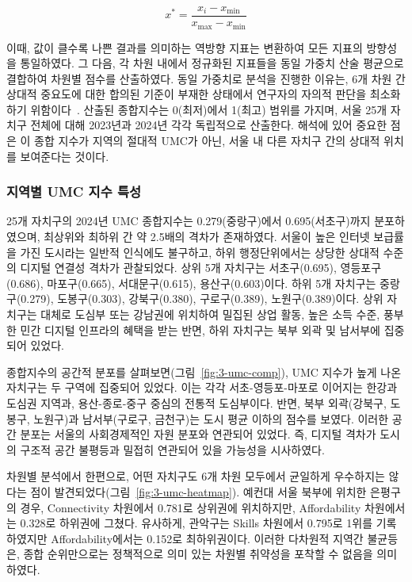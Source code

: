 \begin{equation}\label{eq:minmax}
  x^{*} = \frac{x_{i} - x_{\min}}{x_{\max} - x_{\min}}
\end{equation}

이때, 값이 클수록 나쁜 결과를 의미하는 역방향 지표는 변환하여 모든 지표의 방향성을 통일하였다. 그 다음, 각 차원 내에서 정규화된 지표들을 동일 가중치 산술 평균으로 결합하여 차원별 점수를 산출하였다. 동일 가중치로 분석을 진행한 이유는, 6개 차원 간 상대적 중요도에 대한 합의된 기준이 부재한 상태에서 연구자의 자의적 판단을 최소화하기 위함이다~\citep{ITU2024}. 산출된 종합지수는 0(최저)에서 1(최고) 범위를 가지며, 서울 25개 자치구 전체에 대해 2023년과 2024년 각각 독립적으로 산출한다. 해석에 있어 중요한 점은 이 종합 지수가 지역의 절대적 UMC가 아닌, 서울 내 다른 자치구 간의 상대적 위치를 보여준다는 것이다.

\subsubsection{지역별 UMC 지수 특성}
\label{subsubsec:3-1-3}

25개 자치구의 2024년 UMC 종합지수는 0.279(중랑구)에서 0.695(서초구)까지 분포하였으며, 최상위와 최하위 간 약 2.5배의 격차가 존재하였다. 서울이 높은 인터넷 보급률을 가진 도시라는 일반적 인식에도 불구하고, 하위 행정단위에서는 상당한 상대적 수준의 디지털 연결성 격차가 관찰되었다. 상위 5개 자치구는 서초구(0.695), 영등포구(0.686), 마포구(0.665), 서대문구(0.615), 용산구(0.603)이다. 하위 5개 자치구는 중랑구(0.279), 도봉구(0.303), 강북구(0.380), 구로구(0.389), 노원구(0.389)이다. 상위 자치구는 대체로 도심부 또는 강남권에 위치하여 밀집된 상업 활동, 높은 소득 수준, 풍부한 민간 디지털 인프라의 혜택을 받는 반면, 하위 자치구는 북부 외곽 및 남서부에 집중되어 있었다.

종합지수의 공간적 분포를 살펴보면(그림~\ref{fig:3-umc-comp}), UMC 지수가 높게 나온 자치구는 두 구역에 집중되어 있었다. 이는 각각 서초-영등포-마포로 이어지는 한강과 도심권 지역과, 용산-종로-중구 중심의 전통적 도심부이다. 반면, 북부 외곽(강북구, 도봉구, 노원구)과 남서부(구로구, 금천구)는 도시 평균 이하의 점수를 보였다. 이러한 공간 분포는 서울의 사회경제적인 자원 분포와 연관되어 있었다. 즉, 디지털 격차가 도시의 구조적 공간 불평등과 밀접히 연관되어 있을 가능성을 시사하였다.

차원별 분석에서 한편으로, 어떤 자치구도 6개 차원 모두에서 균일하게 우수하지는 않다는 점이 발견되었다(그림~\ref{fig:3-umc-heatmap}). 예컨대 서울 북부에 위치한 은평구의 경우, Connectivity 차원에서 0.781로 상위권에 위치하지만, Affordability 차원에서는 0.328로 하위권에 그쳤다. 유사하게, 관악구는 Skills 차원에서 0.795로 1위를 기록하였지만 Affordability에서는 0.152로 최하위권이다. 이러한 다차원적 지역간 불균등은, 종합 순위만으로는 정책적으로 의미 있는 차원별 취약성을 포착할 수 없음을 의미하였다.

